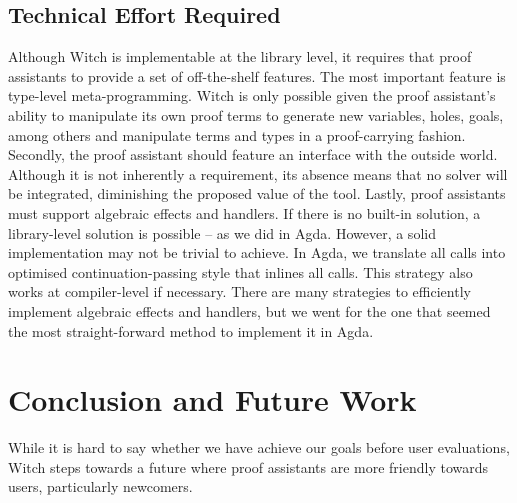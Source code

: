 \documentclass[acmsmall]{acmart}
\begin{document}
\subsection{Technical Effort Required} \label{tech-details}

Although Witch is implementable at the library level, it requires that proof
assistants to provide a set of off-the-shelf features. The most important
feature is type-level meta-programming. Witch is only possible given the proof
assistant's ability to manipulate its own proof terms to generate new variables,
holes, goals, among others and manipulate terms and types in a proof-carrying
fashion. Secondly, the proof assistant should feature an interface with the
outside world. Although it is not inherently a requirement, its absence means
that no solver will be integrated, diminishing the proposed value of the tool.
Lastly, proof assistants must support algebraic effects and handlers. If there
is no built-in solution, a library-level solution is possible -- as we did in
Agda. However, a solid implementation may not be trivial to achieve. In Agda,
we translate all calls into optimised continuation-passing style that inlines
all calls. This strategy also works at compiler-level if necessary. There are
many strategies to efficiently implement algebraic effects and handlers, but we
went for the one that seemed the most straight-forward method to implement it in Agda.

\section{Conclusion and Future Work}

While it is hard to say whether we have achieve our goals before user
evaluations, Witch steps towards a future where proof assistants are more
friendly towards users, particularly newcomers.
\end{document}
